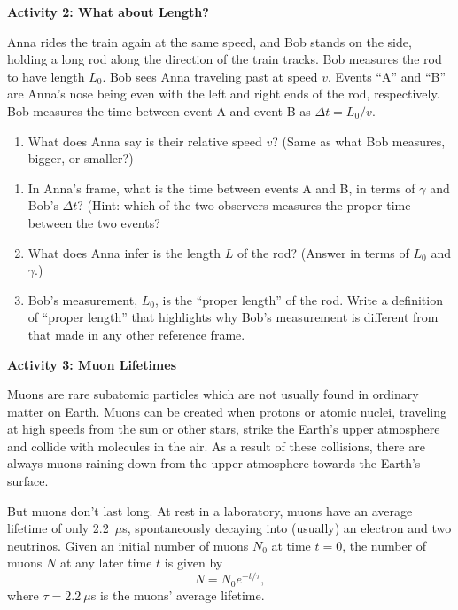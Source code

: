 \textbf{Activity 2: What about Length?}

Anna rides the train again at the same speed, and Bob stands on the side, holding a long rod along the direction of the train tracks.  Bob measures the rod to have length $L_0$.  Bob sees Anna traveling past at speed $v$.  Events ``A'' and ``B'' are Anna's nose being even with the left and right ends of the rod, respectively.  Bob measures the time between event A and event B as $\Delta t=L_0 / v$.  

\begin{enumerate}
\item What does Anna say is their relative speed $v$?  (Same as what Bob measures, bigger, or smaller?)
\answerspace{0.4in}
\end{enumerate}

\begin{enumerate}
\item In Anna's frame, what is the time between events A and B, in terms of $\gamma$ and Bob's $\Delta t$?  (Hint: which of the two observers measures the proper time between the two events?  
\answerspace{0.4in}

\item What does Anna infer is the length $L$ of the rod?  (Answer in terms of $L_0$ and $\gamma$.)
\answerspace{0.4in}

\item Bob's measurement, $L_0$, is the ``proper length'' of the rod.  Write a definition of ``proper length'' that highlights why Bob's measurement is different from that made in any other reference frame.
\answerspace{0.5in}
\end{enumerate}

\pagebreak[2]
\textbf{Activity 3: Muon Lifetimes} 

Muons are rare subatomic particles which are not usually found in ordinary matter on Earth.  Muons can be created when protons or atomic nuclei, traveling at high speeds from the sun or other stars, strike the Earth's upper atmosphere and collide with molecules in the air.  As a result of these collisions, there are always muons raining down from the upper atmosphere towards the Earth's surface.

But muons don't last long.  At rest in a laboratory, muons have an average lifetime of only 2.2~$\mu$s, spontaneously decaying into (usually) an electron and two neutrinos.  Given an initial number of muons $N_0$ at time $t=0$, the number of muons $N$ at any later time $t$ is given by
\begin{equation}
N=N_0 e^{-t/\tau},
\end{equation}
where $\tau = 2.2~\mu$s is the muons' average lifetime.  


